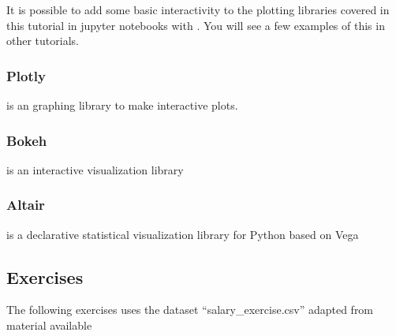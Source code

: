 \documentclass[letterpaper,10pt,english]{sphinxmanual}
\begin{document}
It is possible to add some basic interactivity to the plotting libraries covered in this tutorial in jupyter notebooks with . You will see a few examples of this in other tutorials.


\subsubsection{Plotly}
\label{\detokenize{content/Introduction_to_Plotting:plotly}}
 is an graphing library to make interactive plots.


\subsubsection{Bokeh}
\label{\detokenize{content/Introduction_to_Plotting:bokeh}}
 is an interactive visualization library


\subsubsection{Altair}
\label{\detokenize{content/Introduction_to_Plotting:altair}}
 is a declarative statistical visualization library for Python based on Vega


\subsection{Exercises}
\label{\detokenize{content/Introduction_to_Plotting:exercises}}
The following exercises uses the dataset “salary\_exercise.csv” adapted from material available 
\end{document}
